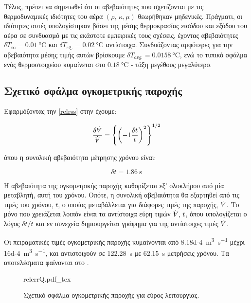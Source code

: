 Τέλος, πρέπει να σημειωθεί ότι οι αβεβαιότητες που σχετίζονται με τις θερμοδυναμικές ιδιότητες του αέρα $\left(\rho, \, \kappa, \mu \right)$ θεωρήθηκαν μηδενικές. Πράγματι, οι ιδιότητες αυτές υπολογίστηκαν βάσει της μέσης θερμοκρασίας εισόδου και εξόδου του αέρα σε συνδυασμό με τις εκάστοτε εμπειρικές τους σχέσεις, έχοντας αβεβαιότητες $\delta T_{\infty} = \qty{0.01}{\degreeCelsius}$ και $\delta T_{\text{εξ.}} = \qty{0.02}{\degreeCelsius}$ αντίστοιχα. Συνδυάζοντας αμφότερες για την αβεβαιότητα μέσης τιμής αυτών βρίσκουμε $\delta T_{avg.} = \qty{0.0158}{\degreeCelsius}$, ενώ το τυπικό σφάλμα ενός θερμοστοιχείου κυμαίνεται στο $\qty{0.18}{\degreeCelsius}$ - τάξη μεγέθους μεγαλύτερο.

\subsection{Σχετικό σφάλμα ογκομετρικής παροχής}\label{flowunc}

\noindent Εφαρμόζοντας την \ref{relrss} στην  έχουμε:

\begin{equation*}
\frac{\delta \dot{\volume}}{\dot{\volume}} = \left\{\left(-1\frac{\delta t}{t}\right) ^ 2\right\} ^ {1/2}
\end{equation*}

\noindent όπου η συνολική αβεβαιότητα μέτρησης χρόνου είναι:

\begin{equation*}
\delta t = \qty{1.86}{\second}
\end{equation*}

\noindent H αβεβαιότητα της ογκομετρικής παροχής καθορίζεται εξ' ολοκλήρου από μία μεταβλητή, αυτή του χρόνου. Οπότε, η συνολική αβεβαιότητα θα εξαρτηθεί από τις τιμές του χρόνου, $t$, ο οποίος μεταβάλλεται για διάφορες τιμές της παροχής, $\dot{\volume}$. Το μόνο που χρειάζεται λοιπόν είναι τα αντίστοιχα εύρη τιμών $\dot{\volume}, \, t$, όπου υπολογίζεται ο λόγος $\delta t / t$ και εν συνεχεία δημιουργείται γράφημα για της αντίστοιχες τιμές $\dot{\volume}$.

Οι πειραματικές τιμές ογκομετρικής παροχής κυμαίνονται από \qty{8.18d-4}{\metre\cubed\per\second} μέχρι \qty{16d-4}{\metre\cubed\per\second}, και αντιστοιχούν σε \qty{122,28}{\second} με \qty{62,15}{\second} μετρήσεις χρόνου. Τα αποτελέσματα φαίνονται στο .

\begin{figure}[tbp]
\centering
{relerrQ.pdf_tex}
\caption{Σχετικό σφάλμα ογκομετρικής παροχής για εύρος λειτουργίας.}\label{plt:relflowE}
\end{figure}

